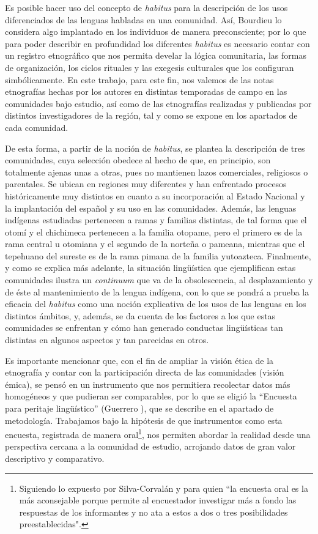 \documentclass[output=paper]{../langscibook}
\begin{document}
Es posible hacer uso del concepto de \textit{habitus} para la descripción de los usos diferenciados de las lenguas habladas en una comunidad. Así, Bourdieu lo considera algo implantado en los individuos de manera preconsciente; por lo que para poder describir en profundidad los diferentes \textit{habitus} es necesario contar con un registro etnográfico que nos permita develar la lógica comunitaria, las formas de organización, los ciclos rituales y las exegesis culturales que los configuran simbólicamente. En este trabajo, para este fin, nos valemos de las notas etnografías hechas por los autores en distintas temporadas de campo en las comunidades bajo estudio, así como de las etnografías realizadas y publicadas por distintos investigadores de la región, tal y como se expone en los apartados de cada comunidad.

De esta forma, a partir de la noción de \textit{habitus}, se plantea la descripción de tres comunidades, cuya selección obedece al hecho de que, en principio, son totalmente ajenas unas a otras, pues no mantienen lazos comerciales, religiosos o parentales. Se ubican en regiones muy diferentes y han enfrentado procesos históricamente muy distintos en cuanto a su incorporación al Estado Nacional y la implantación del español y su uso en las comunidades. Además, las lenguas indígenas estudiadas pertenecen a ramas y familias distintas, de tal forma que el otomí y el chichimeca pertenecen a la familia otopame, pero el primero es de la rama central u otomiana y el segundo de la norteña o pameana, mientras que el tepehuano del sureste es de la rama pimana de la familia yutoazteca. Finalmente, y como se explica más adelante, la situación lingüística que ejemplifican estas comunidades ilustra un \textit{continuum} que va de la obsolescencia, al desplazamiento y de éste al mantenimiento de la lengua indígena, con lo que se pondrá a prueba la eficacia del \textit{habitus} como una noción explicativa de los usos de las lenguas en los distintos ámbitos, y, además, se da cuenta de los factores a los que estas comunidades se enfrentan y cómo han generado conductas lingüísticas tan distintas en algunos aspectos y tan parecidas en otros.

Es importante mencionar que, con el fin de ampliar la visión ética de la etnografía y contar con la participación directa de las comunidades (visión émica), se pensó en un instrumento que nos permitiera recolectar datos más homogéneos y que pudieran ser comparables, por lo que se eligió la “Encuesta para peritaje lingüístico” (Guerrero \citealt{Galván2009}), que se describe en el apartado de metodología. Trabajamos bajo la hipótesis de que instrumentos como esta encuesta, registrada de manera oral\footnote{Siguiendo lo expuesto por Silva-Corvalán y \citet[65]{Enrique-Arias2001} para quien “la encuesta oral es la más aconsejable porque permite al encuestador investigar más a fondo las respuestas de los informantes y no ata a estos a dos o tres posibilidades preestablecidas".}, nos permiten abordar la realidad desde una perspectiva cercana a la comunidad de estudio, arrojando datos de gran valor descriptivo y comparativo.
\end{document}
